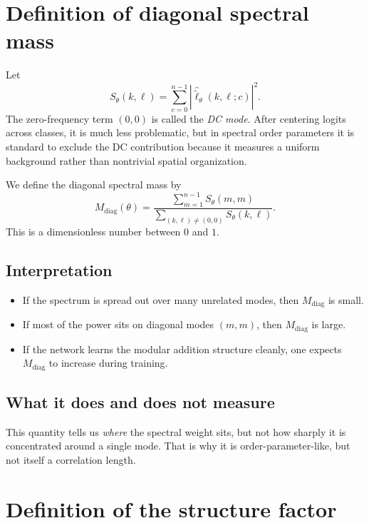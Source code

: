 \documentclass[11pt]{article}
\newcommand{\diag}{\mathrm{diag}}
\begin{document}
\section{Definition of diagonal spectral mass}

Let
\begin{equation}
    S_\theta(k,\ell) = \sum_{c=0}^{n-1} \left|\widehat{\widetilde{\ell}}_\theta(k,\ell;c)\right|^2.
\end{equation}
The zero-frequency term $(0,0)$ is called the \emph{DC mode}. After centering logits across classes, it is much less problematic, but in spectral order parameters it is standard to exclude the DC contribution because it measures a uniform background rather than nontrivial spatial organization.

We define the diagonal spectral mass by
\begin{equation}
    M_{\diag}(\theta)
    = \frac{\sum_{m=1}^{n-1} S_\theta(m,m)}{\sum_{(k,\ell) \neq (0,0)} S_\theta(k,\ell)}.
\end{equation}
This is a dimensionless number between $0$ and $1$.

\subsection{Interpretation}

\begin{itemize}
    \item If the spectrum is spread out over many unrelated modes, then $M_{\diag}$ is small.
    \item If most of the power sits on diagonal modes $(m,m)$, then $M_{\diag}$ is large.
    \item If the network learns the modular addition structure cleanly, one expects $M_{\diag}$ to increase during training.
\end{itemize}

\subsection{What it does and does not measure}

This quantity tells us \emph{where} the spectral weight sits, but not how sharply it is concentrated around a single mode. That is why it is order-parameter-like, but not itself a correlation length.

\section{Definition of the structure factor}
\end{document}
